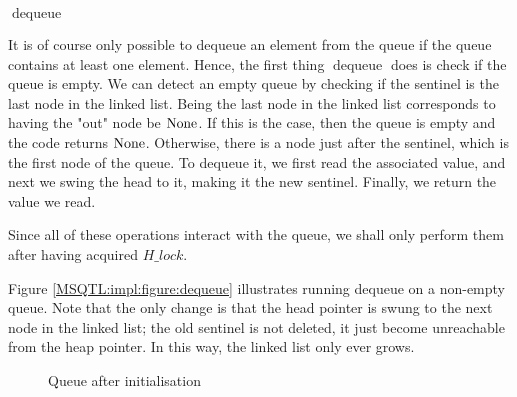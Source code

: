 \documentclass[twoside,11pt,openright]{report}
\newcommand{\dequeue}{\operatorname{dequeue}}
\newcommand{\locin}[1]{\loc_{#1\_\text{in}}}
\newcommand{\locout}[1]{\loc_{#1\_\text{out}}}
\begin{document}
$\dequeue$

It is of course only possible to dequeue an element from the queue if the queue contains at least one element. Hence, the first thing $\dequeue$ does is check if the queue is empty. We can detect an empty queue by checking if the sentinel is the last node in the linked list. Being the last node in the linked list corresponds to having the "out" node be $\operatorname{None}$. If this is the case, then the queue is empty and the code returns $\operatorname{None}$. Otherwise, there is a node just after the sentinel, which is the first node of the queue. To dequeue it, we first read the associated value, and next we swing the head to it, making it the new sentinel. Finally, we return the value we read.

Since all of these operations interact with the queue, we shall only perform them after having acquired $H\_lock$.

Figure \ref{MSQTL:impl:figure:dequeue} illustrates running dequeue on a non-empty queue. Note that the only change is that the head pointer is swung to the next node in the linked list; the old sentinel is not deleted, it just become unreachable from the heap pointer. In this way, the linked list only ever grows.

\begin{figure}[h]
  \centering
  \caption{Queue after initialisation}
  \label{MSQTL:impl:figure:init}
\end{figure}
\end{document}
